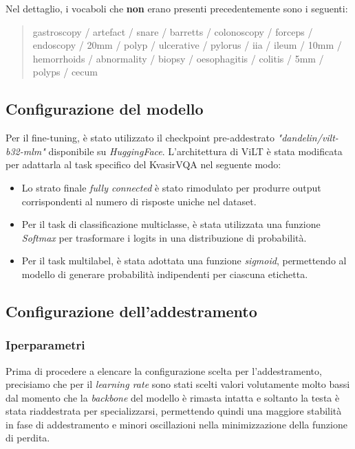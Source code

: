 \documentclass[../main.tex]{subfiles}
\begin{document}
Nel dettaglio, i vocaboli che \textbf{non} erano presenti precedentemente sono i seguenti: 

\begin{quote}
    gastroscopy / artefact / snare / barretts / colonoscopy / forceps / endoscopy / 20mm / polyp / ulcerative / pylorus / iia / ileum / 10mm / hemorrhoids / abnormality / biopsy / oesophagitis / colitis / 5mm / polyps / cecum
\end{quote}

\subsection{Configurazione del modello}

Per il fine-tuning, è stato utilizzato il checkpoint pre-addestrato \textit{"dandelin/vilt-b32-mlm"} disponibile su \textit{HuggingFace}.
L'architettura di ViLT è stata modificata per adattarla al task specifico del KvasirVQA nel seguente modo:
\begin{itemize}
    \item Lo strato finale \textit{fully connected} è stato rimodulato per produrre output corrispondenti al numero di risposte uniche nel dataset.
    \item Per il task di classificazione multiclasse, è stata utilizzata una funzione \textit{Softmax} per trasformare i logits in una distribuzione di probabilità.
    \item Per il task multilabel, è stata adottata una funzione \textit{sigmoid}, permettendo al modello di generare probabilità indipendenti per ciascuna etichetta.
\end{itemize}

\subsection{Configurazione dell'addestramento}

\subsubsection{Iperparametri}

Prima di procedere a elencare la configurazione scelta per l'addestramento, precisiamo che per il \textit{learning rate} sono stati scelti valori volutamente molto bassi dal momento che la \textit{backbone} del modello è rimasta intatta e soltanto la testa è stata riaddestrata per specializzarsi, permettendo quindi una maggiore stabilità in fase di addestramento e minori oscillazioni nella minimizzazione della funzione di perdita.
\end{document}
